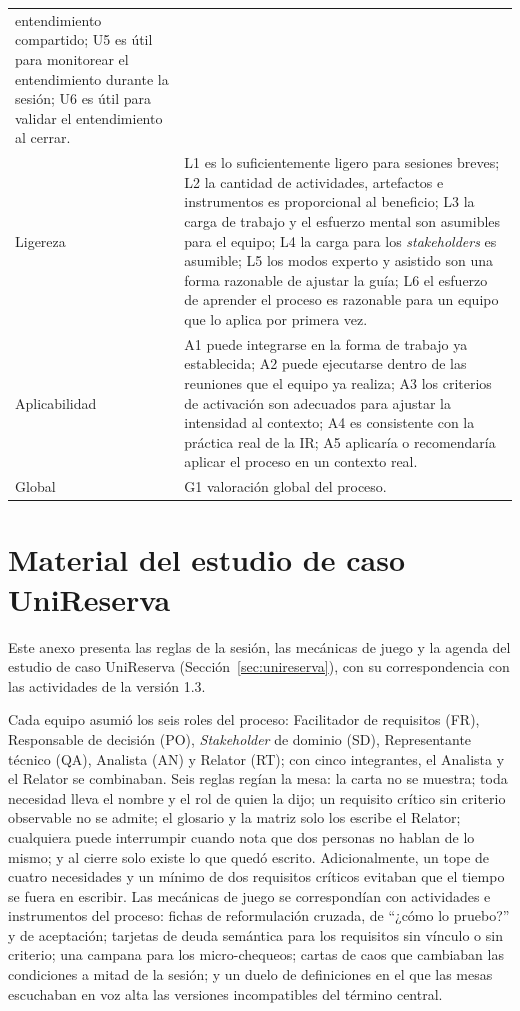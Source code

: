 \documentclass[12pt,letterpaper,oneside]{report}
\begin{document}
{\begin{xltabular}{\textwidth}{@{}>{\raggedright\arraybackslash}p{0.17\textwidth}X@{}}
entendimiento compartido; U5 es útil para monitorear el entendimiento durante la
sesión; U6 es útil para validar el entendimiento al cerrar. \\
\addlinespace
Ligereza & L1 es lo suficientemente ligero para sesiones breves; L2 la cantidad
de actividades, artefactos e instrumentos es proporcional al beneficio; L3 la
carga de trabajo y el esfuerzo mental son asumibles para el equipo; L4 la carga
para los \textit{stakeholders} es asumible; L5 los modos experto y asistido son
una forma razonable de ajustar la guía; L6 el esfuerzo de aprender el proceso es
razonable para un equipo que lo aplica por primera vez. \\
\addlinespace
Aplicabilidad & A1 puede integrarse en la forma de trabajo ya establecida; A2
puede ejecutarse dentro de las reuniones que el equipo ya realiza; A3 los
criterios de activación son adecuados para ajustar la intensidad al contexto; A4
es consistente con la práctica real de la IR; A5 aplicaría o recomendaría
aplicar el proceso en un contexto real. \\
\addlinespace
Global & G1 valoración global del proceso. \\
\end{xltabular}}

\chapter{Material del estudio de caso UniReserva}
\label{anx:unireserva}
Este anexo presenta las reglas de la sesión, las mecánicas de juego y la agenda
del estudio de caso UniReserva (Sección~\ref{sec:unireserva}), con su
correspondencia con las actividades de la versión 1.3.

Cada equipo asumió los seis roles del proceso: Facilitador de requisitos (FR),
Responsable de decisión (PO), \textit{Stakeholder} de dominio (SD), Representante técnico
(QA), Analista (AN) y Relator (RT); con cinco integrantes, el Analista y el
Relator se combinaban. Seis reglas regían la mesa: la carta no se muestra; toda
necesidad lleva el nombre y el rol de quien la dijo; un requisito crítico sin
criterio observable no se admite; el glosario y la matriz solo los escribe el
Relator; cualquiera puede interrumpir cuando nota que dos personas no hablan de
lo mismo; y al cierre solo existe lo que quedó escrito. Adicionalmente, un tope
de cuatro necesidades y un mínimo de dos requisitos críticos evitaban que el
tiempo se fuera en escribir. Las mecánicas de juego se correspondían con
actividades e instrumentos del proceso: fichas de reformulación cruzada, de
``¿cómo lo pruebo?'' y de aceptación; tarjetas de deuda semántica para los
requisitos sin vínculo o sin criterio; una campana para los micro-chequeos;
cartas de caos que cambiaban las condiciones a mitad de la sesión; y un duelo de
definiciones en el que las mesas escuchaban en voz alta las versiones
incompatibles del término central.
\end{document}
